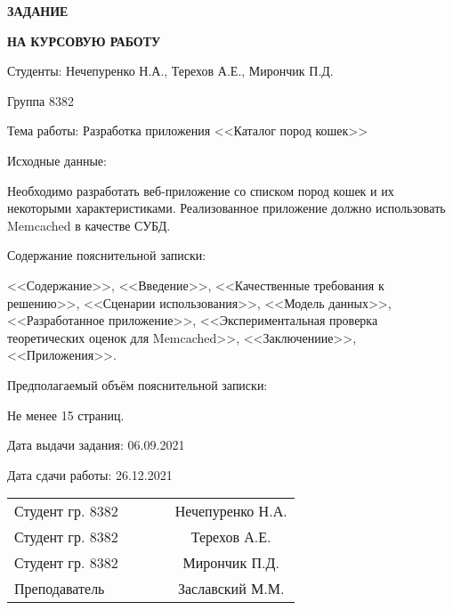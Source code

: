 \pagebreak
\setcounter{page}{2}
\begin{center}
    \textbf{ЗАДАНИЕ}

    \textbf{НА КУРСОВУЮ РАБОТУ}
\end{center}

Студенты: Нечепуренко Н.А., Терехов А.Е., Мирончик П.Д.


Группа 8382


Тема работы: Разработка приложения <<Каталог пород кошек>>


Исходные данные:

Необходимо разработать веб-приложение со списком пород кошек и их
некоторыми характеристиками.
Реализованное приложение должно использовать Memcached в качестве СУБД.


Содержание пояснительной записки:

<<Содержание>>, <<Введение>>, <<Качественные требования к решению>>, <<Сценарии использования>>,
<<Модель данных>>, <<Разработанное приложение>>, <<Экспериментальная проверка теоретических оценок для Memcached>>,
<<Заключениие>>,
<<Приложения>>.

\vspace{3cm}

Предполагаемый объём пояснительной записки:

Не менее 15 страниц.

Дата выдачи задания: 06.09.2021

Дата сдачи работы: 26.12.2021
\vfill

\begin{tabular}{ l c c c c }
 Студент гр. 8382 & \hspace{2cm} & \underline{\hspace{4cm}} & \hspace{1cm} & Нечепуренко Н.А. \\
 Студент гр. 8382 & \hspace{2cm} & \underline{\hspace{4cm}} & \hspace{1cm} & Терехов А.Е. \\
 Студент гр. 8382 & \hspace{2cm} & \underline{\hspace{4cm}} & \hspace{1cm} & Мирончик П.Д. \\
 Преподаватель & \hspace{2cm} & \underline{\hspace{4cm}} & \hspace{1cm} & Заславский М.М.
\end{tabular}
